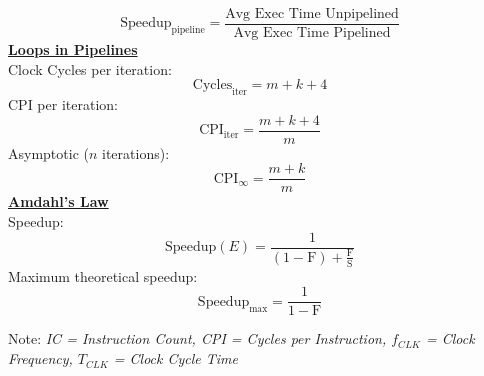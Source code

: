 \documentclass[a4paper,12pt]{article}
\begin{document}
\begin{multicols}{2}
    \begin{equation*}
        \text{Speedup}_{\text{pipeline}} = \frac{\text{Avg Exec Time Unpipelined}}{\text{Avg Exec Time Pipelined}}
    \end{equation*}
    \textbf{\underline{Loops in Pipelines}}
    \\
    Clock Cycles per iteration:
    \begin{equation*}
        \text{Cycles}_{\text{iter}} = m + k + 4
    \end{equation*}
    CPI per iteration:
    \begin{equation*}
        \text{CPI}_{\text{iter}} = \frac{m+k+4}{m}
    \end{equation*}
    Asymptotic ($n$ iterations):
    \begin{equation*}
        \text{CPI}_{\infty} = \frac{m+k}{m}
    \end{equation*}
    \textbf{\underline{Amdahl's Law}}
    \\
    Speedup:
    \begin{equation*}
        \text{Speedup}(E) = \frac{1}{(1-\text{F})+\frac{\text{F}}{\text{S}}}
    \end{equation*}
    Maximum theoretical speedup:
    \begin{equation*}
        \text{Speedup}_{\max} = \frac{1}{1-\text{F}}
    \end{equation*}

    \end{multicols}

    \vfill

    \small{Note: \textit{IC = Instruction Count, CPI = Cycles per Instruction, \( f_{CLK} \) = Clock Frequency, \( T_{CLK} \) = Clock Cycle Time}}
\end{document}
